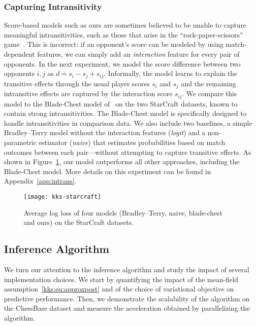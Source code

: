 \subsubsection{Capturing Intransitivity} \label{kks:sec:eval-intrans}
Score-based models such as ours are sometimes believed to be unable to capture meaningful intransitivities, such as those that arise in the ``rock-paper-scissors'' game~\citep{chen2016modeling}.
This is incorrect: if an opponent's score can be modeled by using match-dependent features, we can simply add an \emph{interaction} feature for every pair of opponents.
In the next experiment, we model the score difference between two opponents $i, j$ as $d \doteq s_i - s_j + s_{ij}$.
Informally, the model learns to explain the transitive effects through the usual player scores $s_i$ and $s_j$ and the remaining intransitive effects are captured by the interaction score $s_{ij}$.
We compare this model to the Blade-Chest model of~\citet{chen2016modeling} on the two StarCraft datasets, known to contain strong intransitivities.
The Blade-Chest model is specifically designed to handle intransitivities in comparison data.
We also include two baselines, a simple Bradley--Terry model without the interaction features (\emph{logit}) and a non-parametric estimator (\emph{naive}) that estimates probabilities based on match outcomes between each pair---without attempting to capture transitive effects.
As shown in Figure~\ref{kks:fig:starcraft}, our model outperforms all other approaches, including the Blade-Chest model.
More details on this experiment can be found in Appendix~\ref{app:intrans}.

\begin{figure}[t]
	\texttt{[image: kks-starcraft]}
	\caption{
		Average log loss of four models (Bradley--Terry, naive, blade-chest and ours) on the StarCraft datasets.}
	\label{kks:fig:starcraft}
\end{figure}


\subsection{Inference Algorithm}
\label{kks:sec:evalinf}
We turn our attention to the inference algorithm and study the impact of several implementation choices.
We start by quantifying the impact of the mean-field assumption~\eqref{kks:eq:approxpost} and of the choice of variational objective on predictive performance.
Then, we demonstrate the scalability of the algorithm on the ChessBase dataset and measure the acceleration obtained by parallelizing the algorithm.


